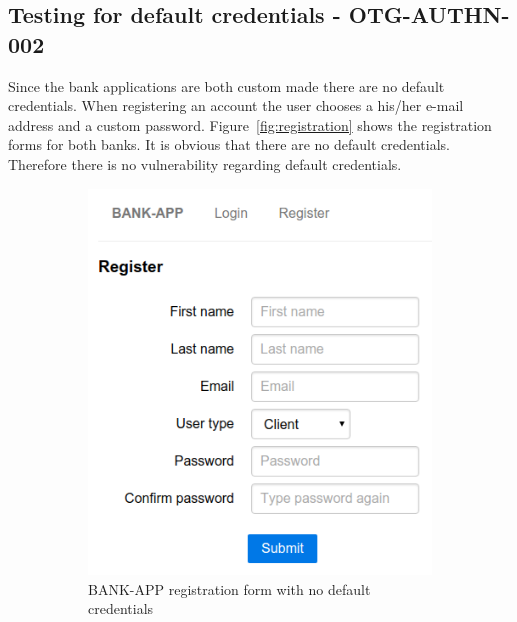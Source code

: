 \subsection{Testing for default credentials - OTG-AUTHN-002}
Since the bank applications are both custom made there are no default credentials. When registering an account the user chooses a his/her e-mail address and a custom password. Figure~\ref{fig:registration} shows the registration forms for both banks. It is obvious that there are no default credentials. Therefore there is no vulnerability regarding default credentials.

\begin{figure}[ht]
	\centering
	\begin{subfigure}{.45\textwidth}
		\centering
		\includegraphics[width=.9\linewidth]{figures/OTG-AUTHN-002_1.png}
		\caption{BANK-APP registration form with no default credentials}
	\end{subfigure}\hfill%
	\begin{subfigure}{.45\textwidth}
		\centering

\end{subfigure}
\end{figure}
